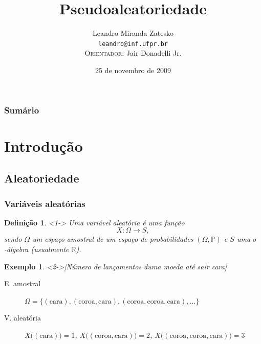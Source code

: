 \documentclass{beamer}
\title{Pseudoaleatoriedade}
\author[Leandro M. Zatesko]{Leandro Miranda Zatesko\\
  \texttt{leandro@inf.ufpr.br}\\
  {\tiny\scshape Orientador:} Jair Donadelli Jr.
}
\institute[ARG]%
{\textcolor{blue}{Grupo de Pesquisa em Algoritmos}}
\date[novembro de 2009]{25 de novembro de 2009}
\def\MMR{\mathbb{R}} %
\def\Prob{\mathbb{P}} %
\def\MMv{\mathrm{,}} %
\def\funcao#1#2#3{#1\colon #2\rightarrow #3} %
\theoremstyle{teoaxicorlem}
\theoremstyle{defnotnom}
\newtheorem{Def}{Definição}
\newtheorem{Ex}{Exemplo}
\begin{document}

\begin{frame}
  \titlepage
\end{frame}

\logo{}

\begin{frame}
  \frametitle{Sumário}
  \tableofcontents
\end{frame}

\setcounter{tocdepth}{1}

\section{Introdução}

\subsection{Aleatoriedade}

\begin{frame}
  \frametitle{Variáveis aleatórias}
  \begin{Def}<1->
    Uma \alert{variável aleatória} é uma função
    \begin{equation*}
      \funcao{X}{\Omega}{S}\MMv
    \end{equation*}
    sendo $\Omega$ um espaço amostral de um espaço de probabilidades
    $(\Omega,\Prob)$ e $S$ uma $\sigma$-álgebra
    (usualmente $\MMR$).
  \end{Def}
  \vfill
  \begin{Ex}<2->[Número de lançamentos duma moeda até sair cara]
    \scriptsize
    \begin{description}
    \item[E. amostral] $\Omega=
      \bigl\{(\text{cara}),(\text{coroa},\text{cara}),
      (\text{coroa},\text{coroa},\text{cara}),\dotsc \bigr\}$
    \item[V. aleatória] $X\bigl((\text{cara})\bigr)=1$,
      $X\bigl((\text{coroa},\text{cara})\bigr) = 2$,
      $X\bigl((\text{coroa},\text{coroa},\text{cara})\bigr)=3$
    \end{description}
  \end{Ex}
\end{frame}
\end{document}
